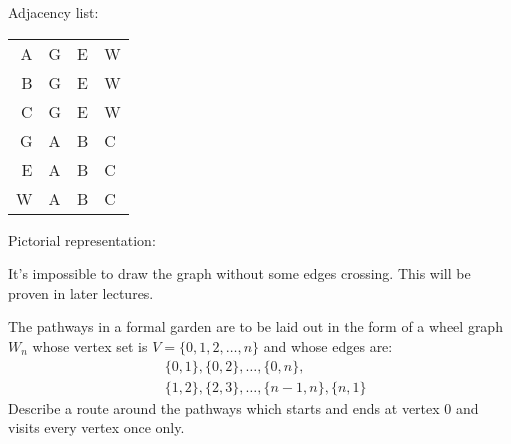 \begin{questions}
\begin{solution}
		Adjacency list:
		\begin{center}
  		\begin{tabular}{r|lll}
  			A & G & E & W \\
  			B & G & E & W \\
  			C & G & E & W \\
  			G & A & B & C \\
  			E & A & B & C \\
  			W & A & B & C
  		\end{tabular}
		\end{center}
		
		Pictorial representation:
		\begin{center}
  	 \begin{adjustbox}{max width=0.6\textwidth}
			\end{adjustbox}
		\end{center}
		It's impossible to draw the graph without some edges crossing.
		This will be proven in later lectures.
	\end{solution}
	


\question
  The pathways in a formal garden are to be laid out in the form of a wheel graph $W_n$ whose vertex set is $V = \{0,1,2,\ldots,n\}$ and whose edges are:
  \begin{align*}
  	&\{0,1\}, \{0,2\}, \ldots, \{0,n\}, \\
  	&\{1,2\}, \{2,3\}, \ldots, \{n-1,n\}, \{n,1\}
  \end{align*}
  Describe a route around the pathways which starts and ends at vertex 0 and visits every vertex once only.~\cite{biggs02}


\end{questions}
